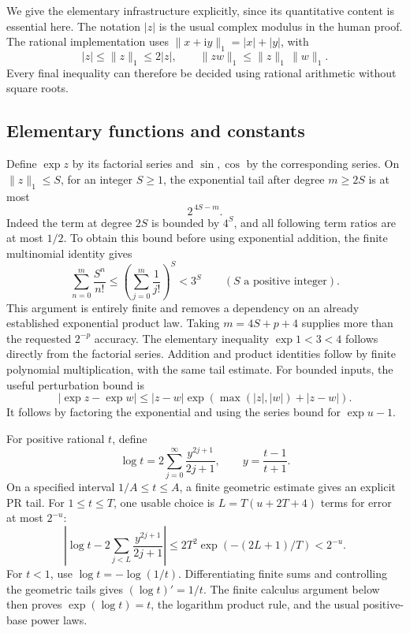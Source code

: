 \documentclass[11pt,letterpaper]{article}
\numberwithin{equation}{section}
\theoremstyle{definition}
\newcommand{\ii}{\mathrm i}
\newcommand{\normone}[1]{\lVert #1\rVert_1}
\begin{document}
We give the elementary infrastructure explicitly, since its quantitative
content is essential here. The notation \(|z|\) is the usual complex
modulus in the human proof. The rational implementation uses
\(\normone{x+\ii y}=|x|+|y|\), with
\[
 |z|\le\normone z\le2|z|,\qquad
 \normone{zw}\le\normone z\,\normone w.
\]
Every final inequality can therefore be decided using rational
arithmetic without square roots.

\subsection{Elementary functions and constants}

Define \(\exp z\) by its factorial series and \(\sin,\cos\) by the
corresponding series. On \(\normone z\le S\), for an integer \(S\ge1\),
the exponential tail after degree \(m\ge2S\) is at most
\begin{equation}
              2^{\,4S-m}.                                 \label{eq:exptail}
\end{equation}
Indeed the term at degree \(2S\) is bounded by \(4^S\), and all
following term ratios are at most \(1/2\).
To obtain this bound before using exponential addition, the finite
multinomial identity gives
\[
 \sum_{n=0}^m\frac{S^n}{n!}
       \le\left(\sum_{j=0}^m\frac1{j!}\right)^S<3^S
       \qquad(S\text{ a positive integer}).
\]
This argument is entirely finite and removes a dependency on an
already established exponential product law.
Taking \(m=4S+p+4\) supplies more than the requested \(2^{-p}\)
accuracy. The elementary inequality \(\exp1<3<4\) follows directly
from the factorial series. Addition and product identities follow
by finite polynomial multiplication, with the same tail estimate.
For bounded inputs, the useful perturbation bound is
\begin{equation}
 |\exp z-\exp w|\le |z-w|\exp(\max(|z|,|w|)+|z-w|).
 \label{eq:expperturb}
\end{equation}
It follows by factoring the exponential and using the series bound for
\(\exp u-1\).

For positive rational \(t\), define
\[
 \log t=2\sum_{j=0}^{\infty}
                 \frac{y^{2j+1}}{2j+1},\qquad y=\frac{t-1}{t+1}.
\]
On a specified interval \(1/A\le t\le A\), a finite geometric
estimate gives an explicit PR tail. For \(1\le t\le T\), one usable
choice is \(L=T(u+2T+4)\) terms for error at most \(2^{-u}\):
\begin{equation}
 \left|\log t-2\sum_{j<L}\frac{y^{2j+1}}{2j+1}\right|
 \le 2T^2\exp(-(2L+1)/T)<2^{-u}.
 \label{eq:logtail}
\end{equation}
For \(t<1\), use \(\log t=-\log(1/t)\).
Differentiating finite sums and controlling the geometric tails gives
\((\log t)'=1/t\). The finite calculus argument below then proves
\(\exp(\log t)=t\), the logarithm product rule, and the usual
positive-base power laws.
\end{document}
